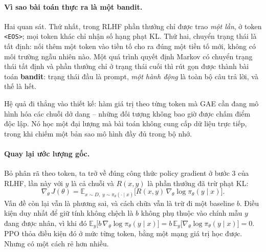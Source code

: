 \paragraph{Vì sao bài toán thực ra là một bandit.}
Hai quan sát. Thứ nhất, trong RLHF phần thưởng chỉ được trao \emph{một lần}, ở token \texttt{<EOS>}; mọi token khác chỉ nhận số hạng phạt KL. Thứ hai, chuyển trạng thái là tất định: nối thêm một token vào tiền tố cho ra đúng một tiền tố mới, không có môi trường ngẫu nhiên nào. Một quá trình quyết định Markov có chuyển trạng thái tất định và phần thưởng chỉ ở trạng thái cuối thì rút gọn được thành bài toán \textbf{bandit}: trạng thái đầu là prompt, \emph{một hành động} là toàn bộ câu trả lời, và thế là hết.

Hệ quả đi thẳng vào thiết kế: hàm giá trị theo từng token mà GAE cần đang mô hình hóa các chuỗi dở dang -- những đối tượng không bao giờ được chấm điểm độc lập. Nó học một đại lượng mà bài toán không cung cấp dữ liệu trực tiếp, trong khi chiếm một bản sao mô hình đầy đủ trong bộ nhớ.

\paragraph{Quay lại ước lượng gốc.}
Bỏ phân rã theo token, ta trở về đúng công thức policy gradient ở bước 3 của RLHF, lần này với \( y \) là cả chuỗi và \( R(x,y) \) là phần thưởng đã trừ phạt KL:
\[
    \nabla_{\theta}\, J(\theta)
    = \mathbb{E}_{x \sim D,\; y \sim \pi_{\theta}(\cdot \mid x)}
    \big[ R(x,y)\, \nabla_{\theta}\log \pi_{\theta}(y \mid x) \big].
\]
Vấn đề còn lại vẫn là phương sai, và cách chữa vẫn là trừ đi một baseline \( b \). Điều kiện duy nhất để giữ tính không chệch là \( b \) không phụ thuộc vào chính mẫu \( y \) đang được nhân, vì khi đó \( \mathbb{E}_y\big[ b\, \nabla_{\theta}\log\pi_{\theta}(y \mid x) \big] = b\, \mathbb{E}_y\big[\nabla_{\theta}\log\pi_{\theta}(y \mid x)\big] = 0 \). PPO thỏa điều kiện đó ở mức từng token, bằng một mạng giá trị học được. Nhưng có một cách rẻ hơn nhiều.

